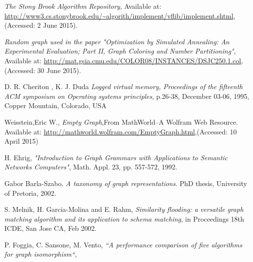 \begin{thebibliography}{19}
	\emph{The Stony Brook Algorithm Repository},
	Available at: \url{http://www3.cs.stonybrook.edu/~algorith/implement/vflib/implement.shtml},
	(Accessed: 2 June 2015).	
		
	\emph{Random graph used in the paper
              "Optimization by Simulated Annealing: An
               Experimental Evaluation; Part II, Graph
               Coloring and Number Partitioning"},
	Available at: \url{http://mat.gsia.cmu.edu/COLOR08/INSTANCES/DSJC250.1.col},
	(Accessed: 30 June 2015).
	
	D. R. Cheriton , K. J. Duda
	\emph{Logged virtual memory, Proceedings of the fifteenth ACM symposium on Operating systems principles},
	 p.26-38, December 03-06, 1995, Copper Mountain, Colorado, USA 
	 
	Weisstein,Eric W.,
	\emph{Empty Graph},From MathWorld–A Wolfram Web Resource.
	Available at: \url{http://mathworld.wolfram.com/EmptyGraph.html},(Accessed: 10 April 2015)
	
	H. Ehrig, 
	\emph{"Introduction to Graph Grammars with Applications to Semantic Networks Computers"},
	Math. Appl. 23, pp. 557-572, 1992.
	
	Gabor Barla-Szabo. \emph{A taxonomy of graph representations}. PhD thesis,
	University of Pretoria, 2002.
	
	S. Melnik, H. Garcia-Molina and E. Rahm, 
	\emph{Similarity flooding: a versatile graph matching algorithm and its application to schema matching},
	in Proceedings 18th ICDE, San Jose
	CA, Feb 2002.
	
	P. Foggia, C. Sansone, M. Vento,
	\emph{“A performance comparison of five algorithms for graph isomorphism“},
\end{thebibliography}